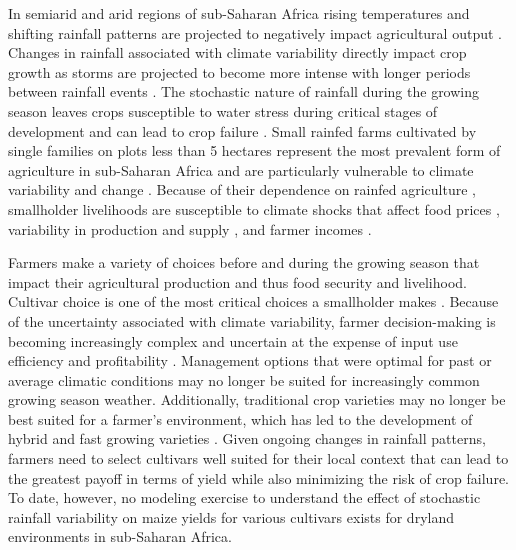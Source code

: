 In semiarid and arid regions of sub-Saharan Africa rising temperatures and shifting rainfall patterns are projected to negatively impact agricultural output \cite{Downing1997-we, Slingo2005-ms, muller2011climate, Branca2011-al}. Changes in rainfall associated with climate variability directly impact crop growth as storms are projected to become more intense with longer periods between rainfall events \cite{meehl2007global,donat2016more, harrison2019identifying, adloff-inreview}. The stochastic nature of rainfall during the growing season leaves crops susceptible to water stress during critical stages of development and can lead to crop failure \cite{sah2020impact, salgado2020physiological}. Small rainfed farms cultivated by single families on plots less than 5 hectares represent the most prevalent form of agriculture in sub-Saharan Africa and are particularly vulnerable to climate variability and change \cite{samberg2016subnational}. Because of their dependence on rainfed agriculture \cite{dinar2008climate}, smallholder livelihoods are susceptible to climate shocks that affect food prices \cite{ray2012recent}, variability in production and supply \cite{lobell2011climate, Slingo2005-ms}, and farmer incomes \cite{reidsma2010adaptation}. 

Farmers make a variety of choices before and during the growing season that impact their agricultural production and thus food security and livelihood. Cultivar choice is one of the most critical choices a smallholder makes \cite{Kalanda-Joshua2011-ot}. Because of the uncertainty associated with climate variability, farmer decision-making is becoming increasingly complex and uncertain at the expense of input use efficiency and profitability \cite{Hansen2011-bk, waldman2019cognitive, guido2020farmer}. Management options that were optimal for past or average climatic conditions may no longer be suited for increasingly common growing season weather. Additionally, traditional crop varieties may no longer be best suited for a farmer’s environment, which has led to the development of hybrid and fast growing varieties \cite{Smale2010-cv}. Given ongoing changes in rainfall patterns, farmers need to select cultivars well suited for their local context that can lead to the greatest payoff in terms of yield while also minimizing the risk of crop failure. To date, however, no modeling exercise to understand the effect of stochastic rainfall variability on maize yields for various cultivars exists for dryland environments in sub-Saharan Africa.  

